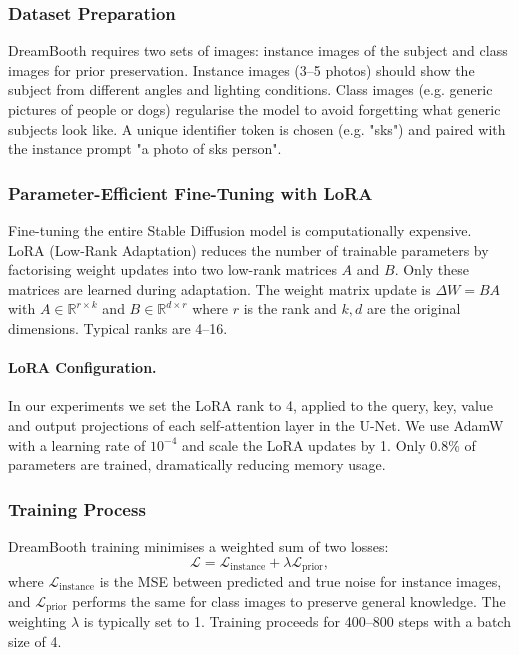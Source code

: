 \subsubsection{Dataset Preparation}

DreamBooth requires two sets of images: instance images of the
subject and class images for prior preservation.  Instance images (3–5
photos) should show the subject from different angles and lighting
conditions.  Class images (e.g. generic pictures of people or dogs)
regularise the model to avoid forgetting what generic subjects look
like.  A unique identifier token is chosen (e.g. "sks") and paired
with the instance prompt "a photo of sks person".

\subsubsection{Parameter-Efficient Fine-Tuning with LoRA}

Fine-tuning the entire Stable Diffusion model is computationally
expensive.  LoRA (Low-Rank Adaptation) reduces the number of trainable
parameters by factorising weight updates into two low-rank matrices
$A$ and $B$.  Only these matrices are learned during adaptation.  The
weight matrix update is $\Delta W = BA$ with $A\in \mathbb{R}^{r\times
k}$ and $B\in \mathbb{R}^{d\times r}$ where $r$ is the rank and
$k,d$ are the original dimensions.  Typical ranks are 4–16.

\paragraph{LoRA Configuration.}  In our experiments we set the LoRA
rank to 4, applied to the query, key, value and output projections of
each self-attention layer in the U-Net.  We use AdamW with a learning
rate of $10^{-4}$ and scale the LoRA updates by 1.  Only 0.8\% of
parameters are trained, dramatically reducing memory usage.

\subsubsection{Training Process}

DreamBooth training minimises a weighted sum of two losses:
\begin{equation}
  \mathcal{L} = \mathcal{L}_{\mathrm{instance}} + \lambda
  \mathcal{L}_{\mathrm{prior}},
\end{equation}
where $\mathcal{L}_{\mathrm{instance}}$ is the MSE between predicted
and true noise for instance images, and $\mathcal{L}_{\mathrm{prior}}$
performs the same for class images to preserve general knowledge.
The weighting $\lambda$ is typically set to 1.  Training proceeds
for 400–800 steps with a batch size of 4.

